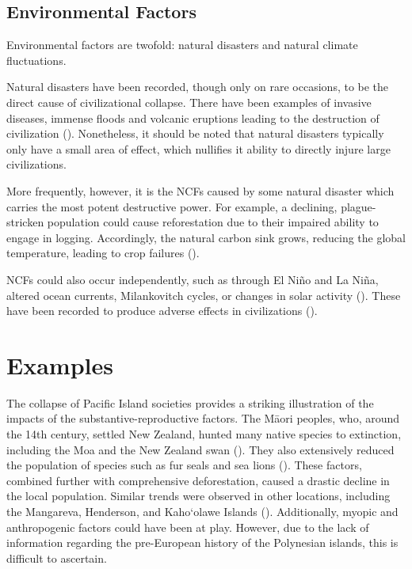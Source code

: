 \subsection{Environmental Factors}

Environmental factors are twofold: natural disasters and natural climate fluctuations. 

Natural disasters have been recorded, though only on rare occasions, to be the direct cause of civilizational collapse. There have been examples of invasive diseases, immense floods and volcanic eruptions leading to the destruction of civilization (\cites[p.\ 289]{ehrenpreis2022historical}[p.\ 1]{rincon2014doggerland}). Nonetheless, it should be noted that natural disasters typically only have a small area of effect, which nullifies it ability to directly injure large civilizations. 

More frequently, however, it is the NCFs caused by some natural disaster which carries the most potent destructive power. For example, a declining, plague-stricken population could cause reforestation due to their impaired ability to engage in logging. Accordingly, the natural carbon sink grows, reducing the global temperature, leading to crop failures (\cites[p.\ 9]{nevle2011neotropical}{juurakko2021cold}). 

NCFs could also occur independently, such as through El Niño and La Niña, altered ocean currents, Milankovitch cycles, or changes in solar activity (\cites[p.\ 1]{loury2016drought}[p.\ 6]{berger2006equatorial}[pp.\ 5–6]{lockwood2010cold}). These have been recorded to produce adverse effects in civilizations (\cite[p.\ 292]{columbia2010angkor}).

\section{Examples}

The collapse of Pacific Island societies provides a striking illustration of the impacts of the substantive-reproductive factors. The Māori peoples, who, around the 14th century, settled New Zealand, hunted many native species to extinction, including the Moa and the New Zealand swan (\cites[p.\ 358]{walter2017polynesian}[p.\ 4922]{allentoft2014extinct}[p.\ 1]{rawlence2017blackswans}). They also extensively reduced the population of species such as fur seals and sea lions (\cite[p.\ 1]{wilmshurst2007deforestation}). These factors, combined further with comprehensive deforestation, caused a drastic decline in the local population. Similar trends were observed in other locations, including the Mangareva, Henderson, and Kaho‘olawe Islands (\cites[p.\ 5]{fagan2010great}[p.\ 132]{diamond2005collapse}[p.\ 443]{rolett2004deforestation}[p.\ 336]{diamond1994ecological}). Additionally, myopic and anthropogenic factors could have been at play. However, due to the lack of information regarding the pre-European history of the Polynesian islands, this is difficult to ascertain.  

